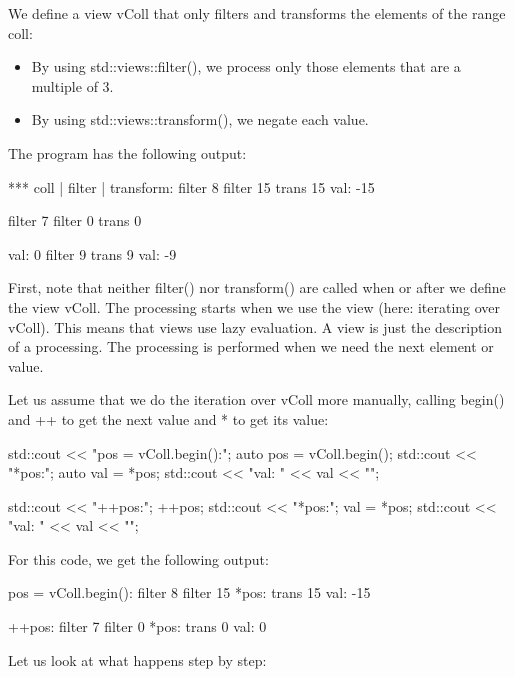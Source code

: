 We define a view vColl that only filters and transforms the elements of the range coll:

\begin{itemize}
\item
By using std::views::filter(), we process only those elements that are a multiple of 3.

\item
By using std::views::transform(), we negate each value.
\end{itemize}

The program has the following output:

\begin{shell}
*** coll | filter | transform:
filter 8
filter 15
trans 15
val: -15

filter 7
filter 0
trans 0

val: 0
filter 9
trans 9
val: -9
\end{shell}

First, note that neither filter() nor transform() are called when or after we define the view vColl. The processing starts when we use the view (here: iterating over vColl). This means that views use lazy evaluation. A view is just the description of a processing. The processing is performed when we need the next element or value.

Let us assume that we do the iteration over vColl more manually, calling begin() and ++ to get the next value and * to get its value:

\begin{cpp}
std::cout << "pos = vColl.begin():\n";
auto pos = vColl.begin();
std::cout << "*pos:\n";
auto val = *pos;
std::cout << "val: " << val << "\n\n";

std::cout << "++pos:\n";
++pos;
std::cout << "*pos:\n";
val = *pos;
std::cout << "val: " << val << "\n\n";
\end{cpp}

For this code, we get the following output:

\begin{shell}
pos = vColl.begin():
filter 8
filter 15
*pos:
trans 15
val: -15

++pos:
filter 7
filter 0
*pos:
trans 0
val: 0
\end{shell}

Let us look at what happens step by step:

